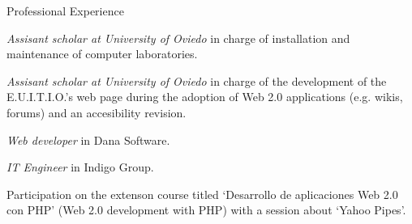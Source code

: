 
\begin{rubric}{Professional Experience}
  
  
  \entry*[2004-2005]
  \emph{Assisant scholar at University of Oviedo} in charge of installation and maintenance of computer laboratories.

  \entry*[2005-2006]
  \emph{Assisant scholar at University of Oviedo} in charge of the development of the E.U.I.T.I.O.'s web page during the adoption of Web 2.0 applications (e.g. wikis, forums) and an accesibility revision.
  
  \entry*[2006-2007]
   \emph{Web developer} in Dana Software.
  
  \entry*[2008-?]
   \emph{IT Engineer} in Indigo Group.

  
  \entry*[2008/11] 
  Participation on the extenson course titled `Desarrollo de aplicaciones Web 2.0 con PHP' (Web 2.0 development with PHP) with a session about `Yahoo Pipes'.
  
\end{rubric}

